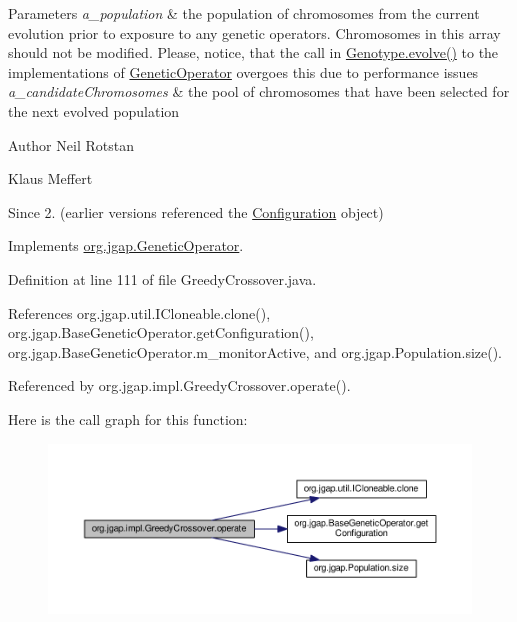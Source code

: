 \begin{DoxyParams}{Parameters}
{\em a\-\_\-population} & the population of chromosomes from the current evolution prior to exposure to any genetic operators. Chromosomes in this array should not be modified. Please, notice, that the call in \hyperlink{classorg_1_1jgap_1_1_genotype_a54a6791fbb6e13920e79f4e2dd719eb4}{Genotype.\-evolve()} to the implementations of \hyperlink{interfaceorg_1_1jgap_1_1_genetic_operator}{Genetic\-Operator} overgoes this due to performance issues \\
\hline
{\em a\-\_\-candidate\-Chromosomes} & the pool of chromosomes that have been selected for the next evolved population\\
\hline
\end{DoxyParams}
\begin{DoxyAuthor}{Author}
Neil Rotstan 

Klaus Meffert 
\end{DoxyAuthor}
\begin{DoxySince}{Since}
2. (earlier versions referenced the \hyperlink{classorg_1_1jgap_1_1_configuration}{Configuration} object) 
\end{DoxySince}


Implements \hyperlink{interfaceorg_1_1jgap_1_1_genetic_operator_a0f9dfe925c4c21e07522be67d6c5d084}{org.\-jgap.\-Genetic\-Operator}.



Definition at line 111 of file Greedy\-Crossover.\-java.



References org.\-jgap.\-util.\-I\-Cloneable.\-clone(), org.\-jgap.\-Base\-Genetic\-Operator.\-get\-Configuration(), org.\-jgap.\-Base\-Genetic\-Operator.\-m\-\_\-monitor\-Active, and org.\-jgap.\-Population.\-size().



Referenced by org.\-jgap.\-impl.\-Greedy\-Crossover.\-operate().



Here is the call graph for this function\-:
\nopagebreak
\begin{figure}[H]
\begin{center}
\leavevmode
\includegraphics[width=350pt]{classorg_1_1jgap_1_1impl_1_1_greedy_crossover_a57adb8d442035ecae43e194f29dff43c_cgraph}
\end{center}
\end{figure}


